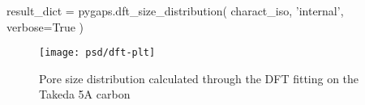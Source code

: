 \begin{python}[caption={DFT size distribution in pyGAPS},%
    label={pyg:lst:dft}]
result_dict = pygaps.dft_size_distribution(
    charact_iso,
    'internal',
    verbose=True
)
\end{python}
\begin{figure}[!htb]
	\texttt{[image: psd/dft-plt]}
	\caption{Pore size distribution calculated through the DFT fitting on the Takeda 5A carbon}%
	\label{fig:pyg:fig:dft}
\end{figure}